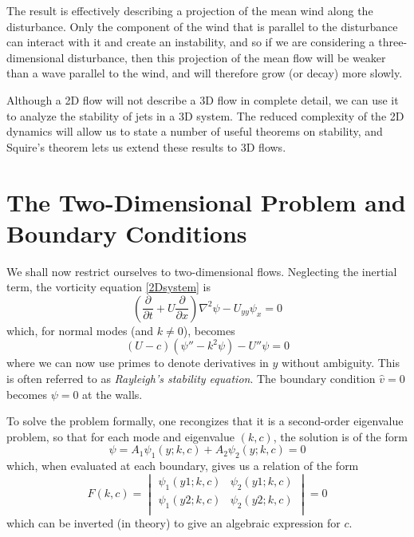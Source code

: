 \documentclass[letterpaper, 11pt, onecolumn]{article}
\newcommand{\pdiff}[2]{\frac{\partial #1}{\partial #2}}
\begin{document}
The result is effectively describing a projection of the mean wind along the disturbance. Only the component of the wind that is parallel to the disturbance can interact with it and create an instability, and so if we are considering a three-dimensional disturbance, then this projection of the mean flow will be weaker than a wave parallel to the wind, and will therefore grow (or decay) more slowly.

Although a 2D flow will not describe a 3D flow in complete detail, we can use it to analyze the stability of jets in a 3D system. The reduced complexity of the 2D dynamics will allow us to state a number of useful theorems on stability, and Squire's theorem lets us extend these results to 3D flows.

\section{The Two-Dimensional Problem and Boundary Conditions}

We shall now restrict ourselves to two-dimensional flows. Neglecting the inertial term, the vorticity equation \eqref{2Dsystem} is
\begin{equation}
\left(\pdiff{}{t} + U \pdiff{}{x} \right) \nabla^2 \psi - U_{yy} \psi_x = 0
\end{equation}
which, for normal modes (and $k \neq 0$), becomes
\begin{equation}
\left(U - c\right) \left(\psi'' - k^2 \psi \right) - U'' \psi = 0
\end{equation}
where we can now use primes to denote derivatives in $y$ without ambiguity. This is often referred to as \emph{Rayleigh's stability equation}. The boundary condition $\hat{v} = 0$ becomes $\psi = 0$ at the walls.

To solve the problem formally, one recongizes that it is a second-order eigenvalue problem, so that for each mode and eigenvalue $(k, c)$, the solution is of the form
\begin{equation*}
\psi = A_1 \psi_1(y; k, c) + A_2 \psi_2(y; k, c) = 0
\end{equation*}
which, when evaluated at each boundary, gives us a relation of the form
\begin{equation*}
F(k, c) = \begin{vmatrix} \psi_1(y1; k, c) & \psi_2(y1; k, c) \\ \psi_1(y2; k, c) & \psi_2(y2; k, c) \\ \end{vmatrix} = 0
\end{equation*}
which can be inverted (in theory) to give an algebraic expression for $c$.
\end{document}
